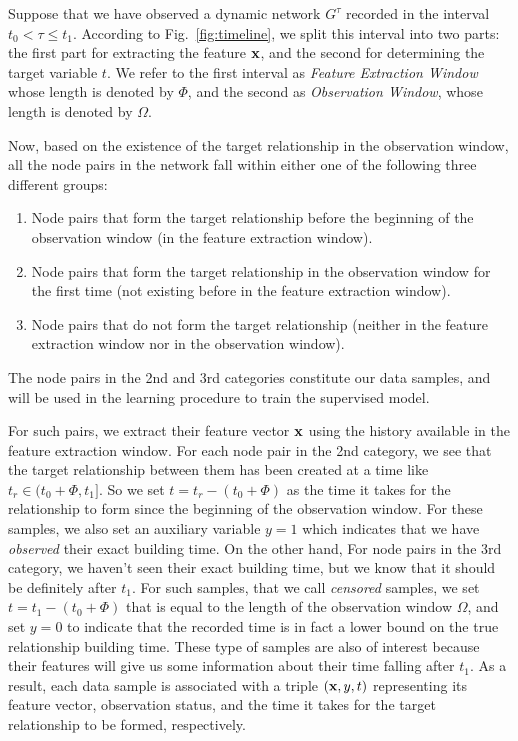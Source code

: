 Suppose that we have observed a dynamic network $G^{\tau}$ recorded in the interval $t_0 <\tau\le t_1$. 
According to Fig.~\ref{fig:timeline}, we split this interval into two parts: the first part for extracting the feature $\mathbf{x}$, and the second for determining the target variable $t$. We refer to the first interval as \emph{Feature Extraction Window} whose length is denoted by $\Phi$, and the second as \emph{Observation Window}, whose length is denoted by $\Omega$. {\color{red}Now, based on the existence of the target relationship in the observation window, all the node pairs in the network fall within either one of the following three different groups:

\begin{enumerate}
	\item Node pairs that form the target relationship before the beginning of the observation window (in the feature extraction window).
	\item Node pairs that form the target relationship in the observation window for the first time (not existing before in the feature extraction window).
	\item Node pairs that do not form the target relationship (neither in the feature extraction window nor in the observation window).
\end{enumerate}

The node pairs in the 2nd and 3rd categories constitute our data samples, and will be used in the learning procedure to train the supervised model.} For such pairs, we extract their feature vector $\mathbf{x}$ using the history available in the feature extraction window. For each node pair in the 2nd category, we see that the target relationship between them has been created at a time like $t_r\in(t_0+\Phi,t_1]$. So we set $t=t_r-(t_0+\Phi)$ as the time it takes for the relationship to form since the beginning of the observation window. For these samples, we also set an auxiliary variable $y=1$ which indicates that we have \emph{observed} their exact building time. On the other hand, For node pairs in the 3rd category, we haven't seen their exact building time, but we know that it should be definitely after $t_1$. For such samples, that we call \emph{censored} samples, we set $t=t_1-(t_0+\Phi)$ that is equal to the length of the observation window $\Omega$, and set $y=0$ to indicate that the recorded time is in fact a lower bound on the true relationship building time. These type of samples are also of interest because their features will give us some information about their time falling after $t_1$. As a result, each data sample is associated with a triple $(\mathbf{x},y,t)$ representing its feature vector, observation status, and the time it takes for the target relationship to be formed, respectively.

